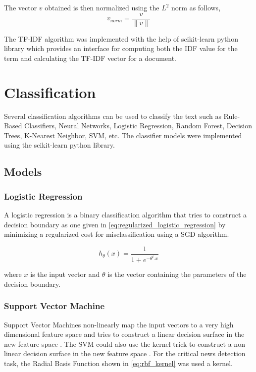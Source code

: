 The vector $v$ obtained is then normalized using the $L^2$ norm as follows,
\begin{equation}
    v_{norm} = \frac{v}{\lVert v \rVert}
\end{equation}

The TF-IDF algorithm was implemented with the help of scikit-learn \cite{scikit-learn} python library which provides an interface for computing both the IDF value for the term and calculating the TF-IDF vector for a document.

\section{Classification}\label{classification}
Several classification algorithms can be used to classify the text such as Rule-Based Classifiers, Neural Networks, Logistic Regression, Random Forest, Decision Trees, K-Nearest Neighbor, SVM\cite{cortes1995support}, etc. 
The classifier models were implemented using the scikit-learn python library.

\subsection{Models}
\subsubsection{Logistic Regression}
A logistic regression is a binary classification algorithm that tries to construct a decision boundary as one given in \eqref{eq:regularized_logistic_regression} by minimizing a regularized cost for misclassification using a SGD algorithm.

\begin{equation}
    \label{eq:regularized_logistic_regression}
    h_{\theta}(x) = \frac{1}{1 + {e}^{-{\theta}^{t}. x}}
\end{equation}

where $x$ is the input vector and $\theta$ is the vector containing the parameters of the decision boundary. 

\subsubsection{Support Vector Machine}
Support Vector Machines non-linearly map the input vectors to a very high dimensional feature space and tries to construct a linear decision surface in the new feature space \cite{cortes1995support}. The SVM could also use the kernel trick to construct a non-linear decision surface in the new feature space \cite{cortes1995support}. For the critical news detection task, the Radial Basis Function shown in \eqref{eq:rbf_kernel} was used a kernel.

